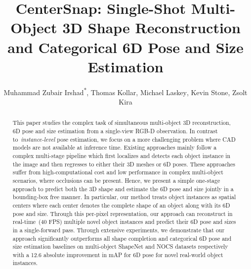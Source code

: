 \documentclass[letter, 10pt, conference]{ieeeconf}
\begin{document}
\title{\LARGE \bf CenterSnap: Single-Shot Multi-Object 3D Shape Reconstruction \\ and
Categorical 6D Pose and Size Estimation}

\author{Muhammad Zubair Irshad\textsuperscript{*}, Thomas Kollar\textsuperscript{}, Michael Laskey\textsuperscript{}, Kevin Stone\textsuperscript{}, Zsolt Kira\textsuperscript{}
}
\maketitle
{
  \renewcommand{\thefootnote}{\fnsymbol{footnote}}
}
\begin{comment}
Recently proposed navigation graph based discrete VLN settings become a poor proxy for real-world robotics navigation.
\end{comment}
  

\begin{abstract}
This paper studies the complex task of simultaneous multi-object 3D reconstruction, 6D pose and size estimation from a single-view RGB-D observation. In contrast to~\textit{instance-level} pose estimation, we focus on a more challenging problem where CAD models are not available at inference time. Existing approaches mainly follow a complex multi-stage pipeline which first localizes and detects each object instance in the image and then regresses to either their 3D meshes or 6D poses. These approaches suffer from high-computational cost and low performance in complex multi-object scenarios, where occlusions can be present. Hence, we present a simple one-stage approach to predict both the 3D shape and estimate the 6D pose and size jointly in a bounding-box free manner. In particular, our method treats object instances as spatial centers where each center denotes the complete shape of an object along with its 6D pose and size. Through this per-pixel representation, our approach can reconstruct in real-time~(40 FPS) multiple novel object instances and predict their 6D pose and sizes in a single-forward pass. Through extensive experiments, we demonstrate that our approach significantly outperforms all shape completion and categorical 6D pose and size estimation baselines on multi-object ShapeNet and NOCS datasets respectively with a 12.6 absolute improvement in mAP for 6D pose for novel real-world object instances.
\end{abstract}
\end{document}
